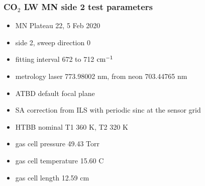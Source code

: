 \documentclass[9pt]{beamer}
\begin{document}
\begin{frame}
\frametitle{CO$_2$ LW MN side 2 test parameters}

\begin{itemize}
  \item MN Plateau 22, 5 Feb 2020
  \item side 2, sweep direction 0
  \item fitting interval 672 to 712 $\mbox{cm$^{-1}$}$
  \item metrology laser 773.98002 nm, from neon 703.44765 nm
  \item ATBD default focal plane
  \item SA correction from ILS with periodic sinc at the sensor grid
  \item HTBB nominal T1 360 K, T2 320 K
  \item gas cell pressure 49.43 Torr
  \item gas cell temperature 15.60 C
  \item gas cell length 12.59 cm
\end{itemize}

\end{frame}
\end{document}
